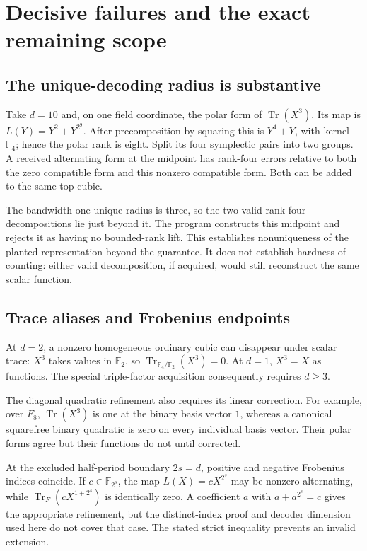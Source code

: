 \documentclass[11pt]{article}
\theoremstyle{remark}\newtheorem{remark}[theorem]{Remark}
\newcommand{\F}{\mathbb F}
\newcommand{\Tr}{\operatorname{Tr}}
\begin{document}
\section{Decisive failures and the exact remaining scope}
\subsection{The unique-decoding radius is substantive}
Take $d=10$ and, on one field coordinate, the polar form of $\Tr(X^3)$. Its map is $L(Y)=Y^2+Y^{2^9}$. After precomposition by squaring this is $Y^4+Y$, with kernel $\F_4$; hence the polar rank is eight. Split its four symplectic pairs into two groups. A received alternating form at the midpoint has rank-four errors relative to both the zero compatible form and this nonzero compatible form. Both can be added to the same top cubic.

The bandwidth-one unique radius is three, so the two valid rank-four decompositions lie just beyond it. The program constructs this midpoint and rejects it as having no bounded-rank lift. This establishes nonuniqueness of the planted representation beyond the guarantee. It does not establish hardness of counting: either valid decomposition, if acquired, would still reconstruct the same scalar function.

\subsection{Trace aliases and Frobenius endpoints}
At $d=2$, a nonzero homogeneous ordinary cubic can disappear under scalar trace: $X^3$ takes values in $\F_2$, so $\Tr_{\F_4/\F_2}(X^3)=0$. At $d=1$, $X^3=X$ as functions. The special triple-factor acquisition consequently requires $d\ge3$.

The diagonal quadratic refinement also requires its linear correction. For example, over $F_8$, $\Tr(X^3)$ is one at the binary basis vector $1$, whereas a canonical squarefree binary quadratic is zero on every individual basis vector. Their polar forms agree but their functions do not until corrected.

At the excluded half-period boundary $2s=d$, positive and negative Frobenius indices coincide. If $c\in\F_{2^s}$, the map $L(X)=cX^{2^s}$ may be nonzero alternating, while $\Tr_F(cX^{1+2^s})$ is identically zero. A coefficient $a$ with $a+a^{2^s}=c$ gives the appropriate refinement, but the distinct-index proof and decoder dimension used here do not cover that case. The stated strict inequality prevents an invalid extension.
\end{document}
